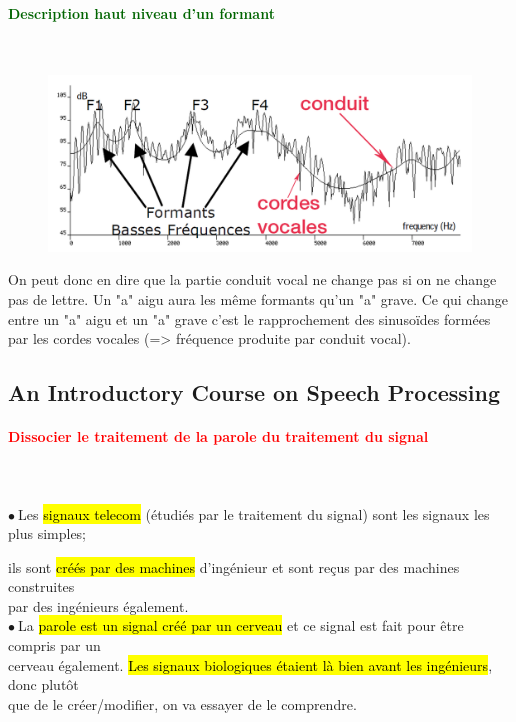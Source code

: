 \documentclass[letterpaper, 12pt]{article}
\newcommand{\alinea}{
\hspace*{0.3cm}}
\newcommand{\red}[1]{
	\textcolor{red}{#1}
}
\newcommand{\green}[1]{
	\textcolor{darkgreen}{#1}
}
\newcommand{\point}{$\bullet\ $}
\begin{document}
			\paragraph{\green{Description haut niveau d'un formant}}~\\
				\begin{minipage}{0.5\textwidth}
					\begin{figure}[H]
						\centering
						\includegraphics[scale=0.33]{Images/formant}
					\end{figure}\noindent
				\end{minipage}\hfill
				\begin{minipage}{0.45\textwidth}
					On peut donc en dire que la partie conduit vocal ne change pas si on ne change pas de lettre.
					Un "a" aigu aura les même formants qu'un "a" grave. Ce qui change entre un "a" aigu et un "a"
					grave c'est le rapprochement des sinusoïdes formées par les cordes vocales (=> fréquence
					produite par conduit vocal).
				\end{minipage}
	\pagebreak		
	\subsection{An Introductory Course on Speech Processing}
		\paragraph{\red{Dissocier le traitement de la parole du traitement du signal}}~\\~\\
			\point Les \hl{signaux telecom} (étudiés par le traitement du signal)
			sont les signaux les plus simples; 
			\alinea ils sont \hl{cr\'e\'es par des machines}
			d'ingénieur et sont reçus par des machines construites \\\alinea par des ingénieurs également.\\
			\point La \hl{parole est un signal cr\'e\'e par un cerveau} et ce signal
			est fait pour être compris par un \\\alinea cerveau
			également. \hl{Les signaux biologiques \'etaient l\`a bien avant les ing\'enieurs}, 
			donc plutôt \\\alinea que de
			le créer/modifier, on va essayer de le comprendre.
\end{document}
